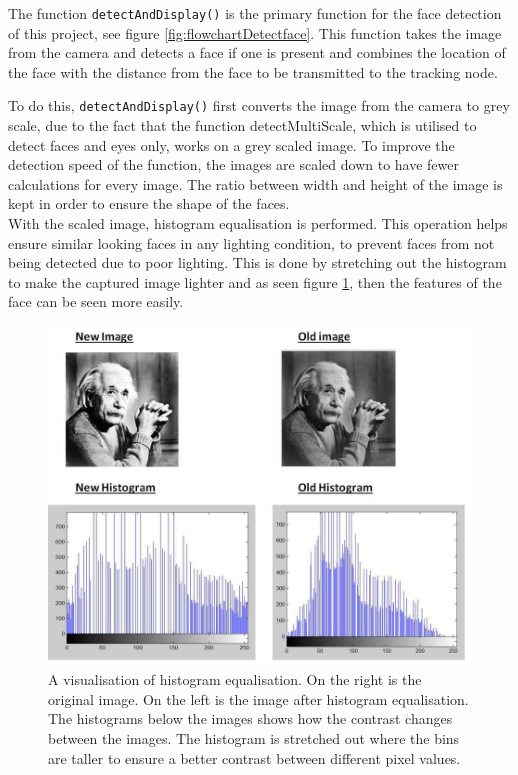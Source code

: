 The function \texttt{detectAndDisplay()} is the primary function for the face detection of this project, see figure \ref{fig:flowchartDetectface}.
This function takes the image from the camera and detects a face if one is present and combines the location of the face with the distance from the face to be transmitted to the tracking node.

To do this, \texttt{detectAndDisplay()} first converts the image from the camera to grey scale, due to the fact that the function detectMultiScale, which is utilised to detect faces and eyes only, works on a grey scaled image. To improve the detection speed of the function, the images are scaled down to have fewer calculations for every image. The ratio between width and height of the image is kept in order to ensure the shape of the faces.\\

With the scaled image, histogram equalisation is performed. This operation helps ensure similar looking faces in any lighting condition, to prevent faces from not being detected due to poor lighting. This is done by stretching out the histogram to make the captured image lighter and as seen figure \ref{fig:contrast}, then the features of the face can be seen more easily.
\begin{figure}[H]
    \centering
    \includegraphics[width=\textwidth]{figures/histogram.jpg}
    \caption{A visualisation of histogram equalisation. On the right is the original image. On the left is the image after histogram equalisation. The histograms below the images shows how the contrast changes between the images. The histogram is stretched out where the bins are taller to ensure a better contrast between different pixel values.\cite{histogram}}
    \label{fig:contrast}
\end{figure}

